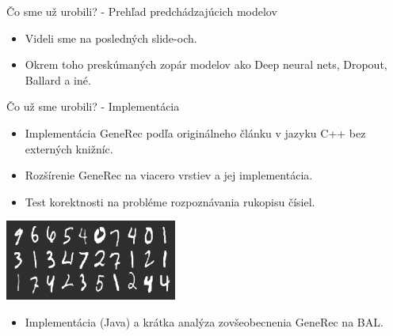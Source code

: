 \documentclass[xcolor=dvipsnames]{beamer}
\begin{document}
\begin{frame}{Čo sme už urobili? - Prehľad predchádzajúcich modelov}
  \begin{itemize}
    \item Videli sme na posledných slide-och. 
    \item Okrem toho preskúmaných zopár modelov ako Deep neural nets, Dropout, Ballard a iné. 
  \end{itemize}
\end{frame}

\begin{frame}{Čo už sme urobili? - Implementácia}
  \begin{itemize}
    \item Implementácia GeneRec podľa originálneho článku v jazyku C++ bez externých knižníc. 
    \item Rozšírenie GeneRec na viacero vrstiev a jej implementácia. 
    \item Test korektnosti na probléme rozpoznávania rukopisu čísiel. 
  \end{itemize}
  \begin{center}
  \includegraphics[scale=1.0]{img/digits.png}
  \end{center}

  \begin{itemize}
    \item Implementácia (Java) a krátka analýza zovšeobecnenia GeneRec na BAL. 
  \end{itemize}
\end{frame}
\end{document}
